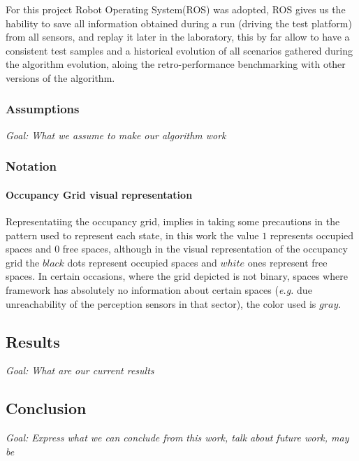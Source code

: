 \documentclass{llncs}
\begin{document}
For this project Robot Operating System(ROS) was adopted, ROS gives us the hability to save all information obtained during a run (driving the test platform) from all sensors, and replay it later in the laboratory, this by far allow to have a consistent test samples and a historical evolution of all scenarios gathered during the algorithm evolution, aloing the retro-performance benchmarking with other versions of the algorithm.

\subsubsection*{Assumptions}

\textit{Goal: What we assume to make our algorithm work}

\subsubsection*{Notation}

\paragraph{Occupancy Grid visual representation}

Representatiing the occupancy grid, implies in taking some precautions in the pattern used to represent each state, in this work the value $1$ represents occupied spaces and $0$ free spaces, although in the visual representation of the occupancy grid the $black$ dots represent occupied spaces and $white$ ones represent free spaces. In certain occasions, where the grid depicted is not binary, spaces where framework has absolutely no information about certain spaces (\textit{e.g.} due unreachability of the perception sensors in that sector), the color used is $gray$.

\subsection{Results}

\textit{Goal: What are our current results}

\subsection{Conclusion}

\textit{Goal: Express what we can conclude from this work, talk about future work, may be}


{}
\end{document}
